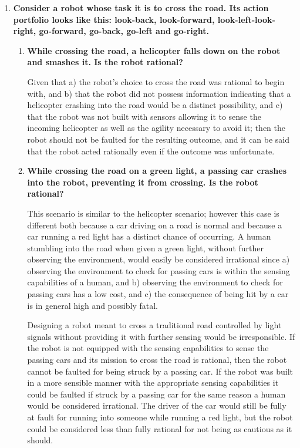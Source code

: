 \begin{enumerate}
\item \textbf{Consider a robot whose task it is to cross the road. Its action portfolio looks like this: look-back, look-forward, look-left-look-right, go-forward, go-back, go-left and go-right.}

\begin{enumerate}

\item \textbf{While crossing the road, a helicopter falls down on the robot and smashes it. Is the robot rational?}

Given that a) the robot's choice to cross the road was rational to begin with, and b) that the robot did not possess information indicating that a helicopter crashing into the road would be a distinct possibility, and c) that the robot was not built with sensors allowing it to sense the incoming helicopter as well as the agility necessary to avoid it; then the robot should not be faulted for the resulting outcome, and it can be said that the robot acted rationally even if the outcome was unfortunate. 

\item \textbf{While crossing the road on a green light, a passing car crashes into the robot, preventing it from crossing. Is the robot rational?}

This scenario is similar to the helicopter scenario; however this case is different both because a car driving on a road is normal and because a car running a red light has a distinct chance of occurring. A human stumbling into the road when given a green light, without further observing the environment, would easily be considered irrational since a) observing the environment to check for passing cars is within the sensing capabilities of a human, and b) observing the environment to check for passing cars has a low cost, and c) the consequence of being hit by a car is in general high and possibly fatal.

Designing a robot meant to cross a traditional road controlled by light signals without providing it with further sensing would be irresponsible. If the robot is not equipped with the sensing capabilities to sense the passing cars and its mission to cross the road is rational, then the robot cannot be faulted for being struck by a passing car. If the robot was built in a more sensible manner with the appropriate sensing capabilities it could be faulted if struck by a passing car for the same reason a human would be considered irrational. The driver of the car would still be fully at fault for running into someone while running a red light, but the robot could be considered less than fully rational for not being as cautious as it should.


\end{enumerate}
\end{enumerate}
